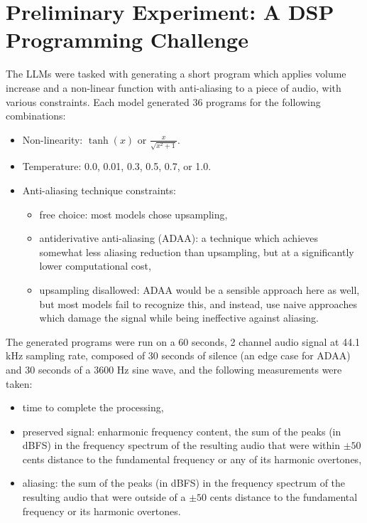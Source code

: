 \documentclass[noindent,nohyp,parspace,titlepage,twoside,12pt]{article}
\begin{document}
\clearpage

    \section{Preliminary Experiment: A DSP Programming Challenge}

      The LLMs were tasked with generating a short program which applies volume
      increase and a non-linear function with anti-aliasing to a piece of audio,
      with various constraints. Each model generated 36 programs for the
      following combinations:

      \begin{itemize}
        \item Non-linearity: $\tanh(x)$ or $\frac{x}{\sqrt{x^2 + 1}}$.
        \item Temperature: 0.0, 0.01, 0.3, 0.5, 0.7, or 1.0.
        \item Anti-aliasing technique constraints:
              \begin{itemize}
                \item free choice: most models chose upsampling,
                \item antiderivative anti-aliasing \cite{adaa} (ADAA): a
                      technique which achieves somewhat less aliasing reduction
                      than upsampling, but at a significantly lower
                      computational cost,
                \item upsampling disallowed: ADAA would be a sensible approach
                      here as well, but most models fail to recognize this, and
                      instead, use naive approaches which damage the signal
                      while being ineffective against aliasing.
              \end{itemize}
      \end{itemize}

      The generated programs were run on a 60 seconds, 2 channel audio signal at
      44.1 kHz sampling rate, composed of 30 seconds of silence (an edge case
      for ADAA) and 30 seconds of a 3600 Hz sine wave, and the following
      measurements were taken:

      \begin{itemize}
        \item time to complete the processing,
        \item preserved signal: enharmonic frequency content, the sum of the
              peaks (in dBFS) in the frequency spectrum of the resulting audio
              that were within $\pm50$ cents distance to the fundamental
              frequency or any of its harmonic overtones,
        \item aliasing: the sum of the peaks (in dBFS) in the frequency
              spectrum of the resulting audio that were outside of a $\pm50$
              cents distance to the fundamental frequency or its harmonic
              overtones.
      \end{itemize}
\end{document}
